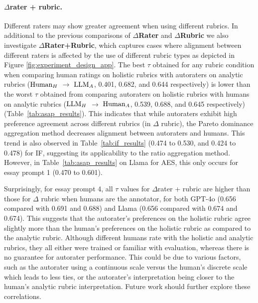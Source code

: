 \paragraph{$\Delta$rater + rubric.}Different raters may show greater agreement when using different rubrics. In additional to the previous comparisons of \textbf{$\Delta$Rater} and \textbf{$\Delta$Rubric} we also investigate \textbf{$\Delta$Rater+Rubric}, which captures cases where alignment between different raters is affected by the use of different rubric types as depicted in Figure \ref{fig:experiment_design_app}. The best $\tau$ obtained for any rubric condition when comparing human ratings on holistic rubrics with autoraters on analytic rubrics ($\textnormal{Human}_{H}$ $\to$ $\textnormal{LLM}_{A}$, 0.401, 0.682, and 0.644 respectively) is lower than the worst $\tau$ obtained from comparing autoraters on holistic rubrics with humans on analytic rubrics ($\textnormal{LLM}_{H}$ $\to$ $\textnormal{Human}_{A}$, 0.539, 0.688, and 0.645 respectively) (Table~\ref{tab:asap_results}). This indicates that while autoraters exhibit high preference agreement across different rubrics (in $\Delta$ rubric), the Pareto dominance aggregation method decreases alignment between autoraters and humans. This trend is also observed in Table~\ref{tab:if_results} (0.474 to 0.530, and 0.424 to 0.478) for IF, suggesting its applicability to the ratio aggregation method. However, in Table~\ref{tab:asap_results} on Llama for AES, this only occurs for essay prompt 1 (0.470 to 0.601).

Surprisingly, for essay prompt 4, all $\tau$ values for $\Delta$rater + rubric are higher than those for $\Delta$ rubric when humans are the annotator, for both GPT-4o (0.656 compared with 0.691 and 0.688) and Llama (0.656 compared with 0.674 and 0.674). This suggests that the autorater's preferences on the holistic rubric agree slightly more than the human's preferences on the holistic rubric as compared to the analytic rubric. Although different humans rate with the holistic and analytic rubrics, they all either were trained or familiar with evaluation, whereas there is no guarantee for autorater performance. This could be due to various factors, such as the autorater using a continuous scale versus the human's discrete scale which leads to less ties, or the autorater's interpretation being closer to the human's analytic rubric interpretation. Future work should further explore these correlations.


